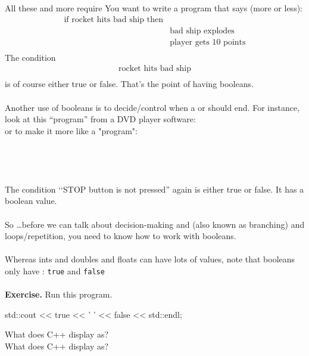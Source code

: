 All these and more require \textbf{} You want to write a program that says (more or less):\\
\begin{align*}
  \text{if rocket hits bad ship then}\\
& \text{bad ship explodes}\\
& \text{player gets 10 points}\\
\end{align*}
The condition
\begin{align*}
\text{rocket hits bad ship}\\
\end{align*}
is of course either true or false. That's the point of having booleans.\\\\
Another use of booleans is to decide/control when a \textbf{} or \textbf{} should end. For instance, look at this “program” from a DVD player software:\\
or to make it more like a "program":\\
\\
\\
\\\\
The condition \lq\lq STOP button is not pressed'' again is either true or false. It has a boolean value.\\\\
So \dots before we can talk about decision-making and (also known as
branching) and loops/repetition, you need to know how to work with booleans.\\\\
Whereas ints and doubles and floats can have lots of values, note that booleans only have \textbf{}: \verb!true! and \verb!false!\\\\

\textbf{Exercise.} Run this program.\\
\begin{console}
  std::cout << true << ' '
            << false << std::endl;
\end{console}
What does C++ display  as? \underline{\mbox{}\hspace{1in}}\\
What does C++ display  as? \underline{\mbox{}\hspace{1in}}

